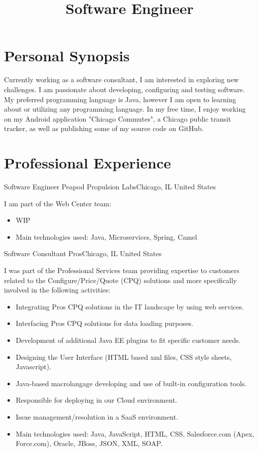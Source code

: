 \documentclass[12pt,a4paper]{moderncv}
\title{Software Engineer}
\begin{document}
\maketitle

\section{Personal Synopsis}
Currently working as a software consultant, I am interested in exploring new challenges. I am passionate about developing, configuring and testing software. My preferred programming language is Java, however I am open to learning about or utilizing any programming language. In my free time, I enjoy working on my Android application "Chicago Commutes", a Chicago public transit tracker, as well as publishing some of my source code on GitHub.

\section{Professional Experience}
		{Software Engineer}
		{Peapod Propulsion Labs}{Chicago, IL}
		{United States}
		{
		I am part of the Web Center team: 
		\begin{itemize}[label=\textbullet]
		    \item WIP
		    \item Main technologies used: Java, Microservices, Spring, Camel
		\end{itemize}
		}{}
		{Software Consultant}
		{Pros}{Chicago, IL}
		{United States}
		{
		I was part of the Professional Services team providing expertise to customers related to the Configure/Price/Quote (CPQ) solutions and more specifically involved in the following activities: 
		\begin{itemize}[label=\textbullet]
		    \item Integrating Pros CPQ solutions in the IT landscape by using web services.
		    \item Interfacing Pros CPQ solutions for data loading purposes.
		    \item Development of additional Java EE plugins to fit specific customer needs.
		    \item Designing the User Interface (HTML based xml files, CSS style sheets, Javascript).
		    \item Java-based macrolangage developing and use of built-in configuration tools.
		    \item Responsible for deploying in our Cloud environment.
		    \item Issue management/resolution in a SaaS environment.
		    \item Main technologies used: Java, JavaScript, HTML, CSS, Salesforce.com (Apex, Force.com), Oracle, JBoss, JSON, XML, SOAP.
		\end{itemize}
		}{}
\end{document}
